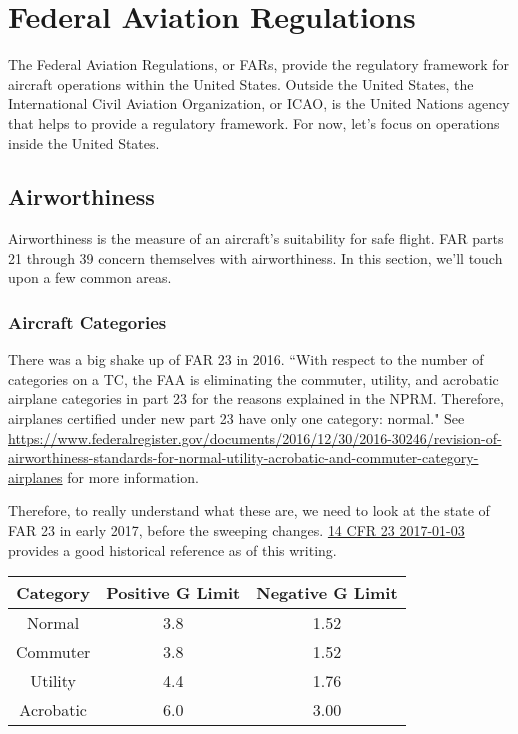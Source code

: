 \chapter{Federal Aviation Regulations}

The Federal Aviation Regulations, or FARs, provide the regulatory framework for aircraft operations within the United States. Outside the United States, the International Civil Aviation Organization, or ICAO, is the United Nations agency that helps to provide a regulatory framework. For now, let's focus on operations inside the United States.

\section{Airworthiness}

Airworthiness is the measure of an aircraft's suitability for safe flight. FAR parts 21 through 39 concern themselves with airworthiness. In this section, we'll touch upon a few common areas.

\subsection{Aircraft Categories}

There was a big shake up of FAR 23 in 2016. ``With respect to the number of categories on a TC, the FAA is eliminating the commuter, utility, and acrobatic airplane categories in part 23 for the reasons explained in the NPRM. Therefore, airplanes certified under new part 23 have only one category: normal." See \url{https://www.federalregister.gov/documents/2016/12/30/2016-30246/revision-of-airworthiness-standards-for-normal-utility-acrobatic-and-commuter-category-airplanes} for more information.

Therefore, to really understand what these are, we need to look at the state of FAR 23 in early 2017, before the sweeping changes. \href{https://www.ecfr.gov/on/2017-01-03/title-14/chapter-I/subchapter-C/part-23}{14 CFR 23 2017-01-03} provides a good historical reference as of this writing.

\begin{center}
\begin{tabular}{ |c|c|c| }
\hline
Category & Positive G Limit & Negative G Limit \\
\hline
Normal    & 3.8 & 1.52 \\
Commuter  & 3.8 & 1.52 \\
Utility   & 4.4 & 1.76 \\
Acrobatic & 6.0 & 3.00 \\
\hline
\end{tabular}
\end{center}

